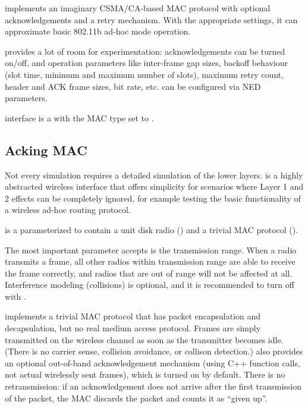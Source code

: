  implements an imaginary CSMA/CA-based MAC protocol with
optional acknowledgements and a retry mechanism. With the appropriate settings,
it can approximate basic 802.11b ad-hoc mode operation.

 provides a lot of room for experimentation: 
acknowledgements can be turned on/off, and operation parameters like
inter-frame gap sizes, backoff behaviour (slot time, minimum and maximum 
number of slots), maximum retry count, header and ACK frame sizes, bit rate,
etc. can be configured via NED parameters.

 interface is a  with
the MAC type set to . 

\subsection{Acking MAC}

Not every simulation requires a detailed simulation of the lower layers.
 is a highly abstracted wireless interface 
that offers simplicity for scenarios where Layer 1 and 2 effects can be 
completely ignored, for example testing the basic functionality of a 
wireless ad-hoc routing protocol.

 is a  
parameterized to contain a unit disk radio ()
and a trivial MAC protocol (). 

The most important parameter  accepts is the 
transmission range. When a radio transmits a frame, all other radios 
within transmission range are able to receive the frame correctly, 
and radios that are out of range will not be affected at all. 
Interference modeling (collisions) is optional, and it is recommended
to turn off with .

 implements a trivial MAC protocol that has packet
encapsulation and decapsulation, but no real medium access protocol. 
Frames are simply transmitted on the wireless channel as soon as the
transmitter becomes idle. (There is no carrier sense, collision avoidance, 
or collison detection.)  also provides an optional 
out-of-band acknowledgement mechanism (using C++ function calls, 
not actual wirelessly sent frames), which is turned on by default.
There is no retransmission: if an acknowledgement does not arrive
after the first transmission of the packet, the MAC discards the
packet and counts it as ``given up''. 

